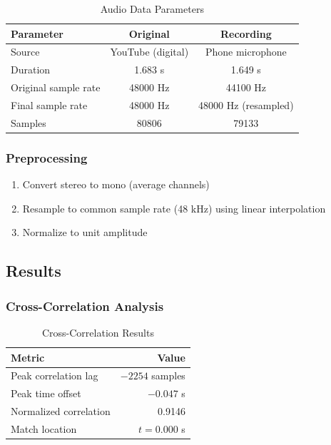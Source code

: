 \documentclass[12pt,a4paper]{article}
\begin{document}
\begin{table}[H]
\centering
\caption{Audio Data Parameters}
\label{tab:audio_data}
\begin{tabular}{@{}lcc@{}}
\toprule
\textbf{Parameter} & \textbf{Original} & \textbf{Recording} \\
\midrule
Source & YouTube (digital) & Phone microphone \\
Duration & 1.683 s & 1.649 s \\
Original sample rate & 48000 Hz & 44100 Hz \\
Final sample rate & 48000 Hz & 48000 Hz (resampled) \\
Samples & 80806 & 79133 \\
\bottomrule
\end{tabular}
\end{table}

\subsubsection{Preprocessing}

\begin{enumerate}
    \item Convert stereo to mono (average channels)
    \item Resample to common sample rate (48 kHz) using linear interpolation
    \item Normalize to unit amplitude
\end{enumerate}

\subsection{Results}

\subsubsection{Cross-Correlation Analysis}

\begin{table}[H]
\centering
\caption{Cross-Correlation Results}
\label{tab:xcorr_results}
\begin{tabular}{@{}lr@{}}
\toprule
\textbf{Metric} & \textbf{Value} \\
\midrule
Peak correlation lag & $-2254$ samples \\
Peak time offset & $-0.047$ s \\
Normalized correlation & 0.9146 \\
Match location & $t = 0.000$ s \\
\bottomrule
\end{tabular}
\end{table}
\end{document}
